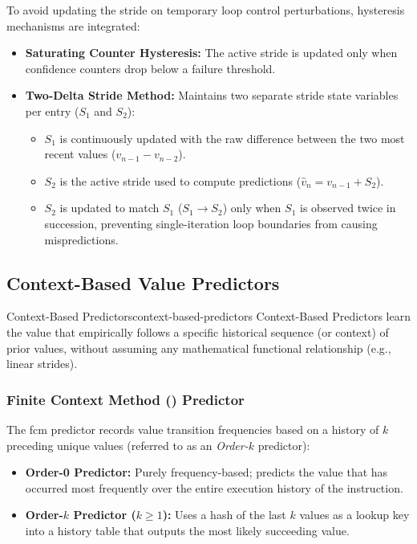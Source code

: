To avoid updating the stride on temporary loop control perturbations, hysteresis mechanisms are integrated:
\begin{itemize}
    \item \textbf{Saturating Counter Hysteresis:} The active stride is updated only when confidence counters drop below a failure threshold.
    \item \textbf{Two-Delta Stride Method:} Maintains two separate stride state variables per entry ($S_1$ and $S_2$):
    \begin{itemize}
        \item $S_1$ is continuously updated with the raw difference between the two most recent values ($v_{n-1} - v_{n-2}$).
        \item $S_2$ is the active stride used to compute predictions ($\hat{v}_n = v_{n-1} + S_2$).
        \item $S_2$ is updated to match $S_1$ ($S_1 \to S_2$) only when $S_1$ is observed twice in succession, preventing single-iteration loop boundaries from causing mispredictions.
    \end{itemize}
\end{itemize}

\subsection{Context-Based Value Predictors}
\label{subsec:context_based_predictors}

\begin{concept}{Context-Based Predictors}{context-based-predictors}
Context-Based Predictors learn the value that empirically follows a specific historical sequence (or context) of prior values, without assuming any mathematical functional relationship (e.g., linear strides).
\end{concept}

\subsubsection{Finite Context Method () Predictor}
The \gls{fcm} predictor records value transition frequencies based on a history of $k$ preceding unique values (referred to as an \textit{Order-$k$} predictor):
\begin{itemize}
    \item \textbf{Order-0 Predictor:} Purely frequency-based; predicts the value that has occurred most frequently over the entire execution history of the instruction.
    \item \textbf{Order-$k$ Predictor ($k \ge 1$):} Uses a hash of the last $k$ values as a lookup key into a history table that outputs the most likely succeeding value.
\end{itemize}

